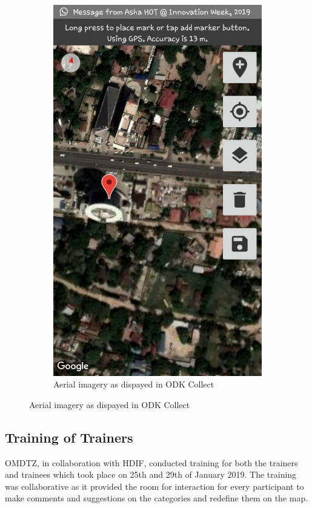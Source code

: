\documentclass[a4paper,12pt,twoside]{article}
\begin{document}
\begin{figure}
  \begin{subfigure}[b]{0.3\textwidth}
    \includegraphics[width=\textwidth]{images/ODK_2.jpeg}
    \color{OMDTZgreen}\caption{Aerial imagery as dispayed in ODK Collect}
    \label{fig:2}
  \end{subfigure}
\end{figure}

\subsection{Training of Trainers}
OMDTZ, in collaboration with HDIF, conducted training for both the trainers and trainees which took place on 25th and 29th of January 2019. The training was collaborative as it provided the room for interaction for every participant to make comments and suggestions on the categories and redefine them on the map.
\medskip
\end{document}

